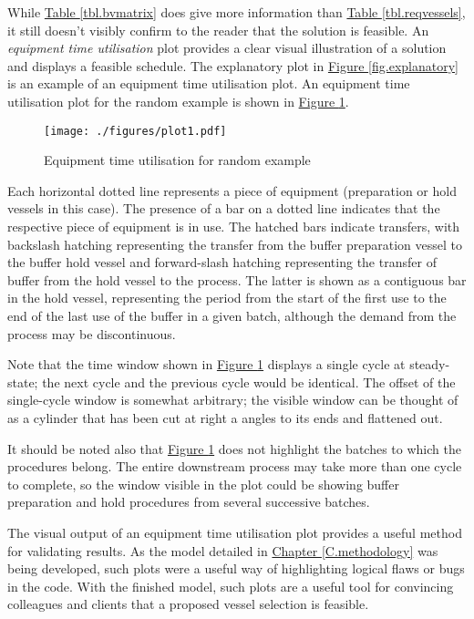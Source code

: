 While \hyperref[tbl.bvmatrix]{Table \ref*{tbl.bvmatrix}} does give more
information than \hyperref[tbl.reqvessels]{Table \ref*{tbl.reqvessels}},
it still doesn't visibly confirm to the reader that the solution is feasible.
An \emph{equipment time utilisation} plot provides a clear visual illustration
of a solution and displays a feasible schedule.
The explanatory plot in 
\hyperref[fig.explanatory]{Figure \ref*{fig.explanatory}} is an example of an
equipment time utilisation plot.  
An equipment time utilisation plot for the random example is shown in
\hyperref[fig.etu1]{Figure \ref*{fig.etu1}}.
\begin{figure}
    \centering
    \texttt{[image: ./figures/plot1.pdf]}
    \caption{Equipment time utilisation for random example}
    \label{fig.etu1}
\end{figure}
Each horizontal dotted line represents a piece of equipment (preparation or
hold vessels in this case).
The presence of a bar on a dotted line indicates that the respective piece of
equipment is in use.  
The hatched bars indicate transfers, with backslash hatching representing the
transfer from the buffer preparation vessel to the buffer hold vessel and
forward-slash hatching representing the transfer of buffer from the hold vessel
to the process.
The latter is shown as a contiguous bar in the hold vessel, representing the
period from the start of the first use to the end of the last use of the buffer
in a given batch, although the demand from the process may be discontinuous.

Note that the time window shown in \hyperref[fig.etu1]{Figure \ref*{fig.etu1}}
displays a single cycle at steady-state; the next cycle and the previous cycle
would be identical.
The offset of the single-cycle window is somewhat arbitrary; the
visible window can be thought of as a cylinder that has been cut at right a
angles to its ends and flattened out.

It should be noted also that \hyperref[fig.etu1]{Figure \ref*{fig.etu1}}
does not highlight the batches to which the procedures belong.
The entire downstream process may take more than one cycle to complete, so the
window visible in the plot could be showing buffer preparation and hold
procedures from several successive batches.

The visual output of an equipment time utilisation plot provides a useful
method for validating results.
As the model detailed in 
\hyperref[C.methodology]{Chapter \ref*{C.methodology}} was being developed,
such plots were a useful way of highlighting logical flaws or bugs in the code.
With the finished model, such plots are a useful tool for convincing
colleagues and clients that a proposed vessel selection is feasible.

